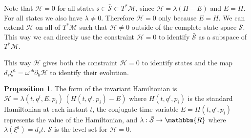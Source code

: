 \documentclass[aps,pra,10pt,twocolumn,floatfix,nofootinbib]{revtex4-1}
\numberwithin{equation}{section}
\theoremstyle{definition}
\newtheorem{prop}[equation]{Proposition}
\begin{document}
Note that $\mathcal{H}=0$ for all states $\mathcal{s} \in \bar{\mathcal{S}} \subset T^* \mathcal{M}$, since $\mathcal{H}=\lambda(H-E)$ and $E = H$. For all states we also have $\lambda \neq 0$. Therefore $\mathcal{H}=0$ only because $E = H$. We can extend $\mathcal{H}$ on all of $T^* \mathcal{M}$ such that $\mathcal{H} \neq 0$ outside of the complete state space $\bar{\mathcal{S}}$. This way we can directly use the constraint $\mathcal{H}=0$ to identify $\bar{\mathcal{S}}$ as a subspace of $T^* \mathcal{M}$.

This way $\mathcal{H}$ gives both the constraint $\mathcal{H}=0$ to identify states and the map $d_s \xi^a=\omega^{ab} \partial_b \mathcal{H}$ to identify their evolution.

\begin{prop}\label{prop:form_of_invariant_hamiltonian}
	The form of the invariant Hamiltonian is $\mathcal{H} = \lambda(t,q^i,E,p_i) \, (H(t,q^i,p_i) - E)$ where $H(t,q^i,p_i)$ is the standard Hamiltonian at each instant $t$, the conjugate time variable $E = H(t,q^i,p_i)$ represents the value of the Hamiltonian, and  $\lambda : \bar{\mathcal{S}} \rightarrow \mathbbm{R}$ where $\lambda(\xi^a) = d_s t$. $\bar{\mathcal{S}}$ is the level set for $\mathcal{H} = 0$.
\end{prop}
\end{document}
